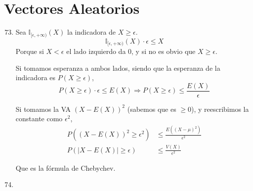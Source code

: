 \section{Vectores Aleatorios}
\begin{enumerate}
	\setcounter{enumi}{72}
	\item
		Sea $\mathbb{I}_{[\epsilon, +\infty)}(X)$ la indicadora de $X\geq \epsilon$.
		$$\mathbb{I}_{[\epsilon, +\infty)}(X)\cdot \epsilon \leq X$$
		Porque si $X<\epsilon$ el lado izquierdo da $0$, y si no es obvio que $X\geq \epsilon$.
		
		Si tomamos esperanza a ambos lados, siendo que la esperanza de la indicadora es $P(X \geq \epsilon)$,
		$$P(X\geq\epsilon) \cdot \epsilon \leq E(X) \Rightarrow P(X\geq\epsilon) \leq \frac{E(X)}{\epsilon}$$
		
		Si tomamos la VA $(X - E(X))^2$ (sabemos que es $\geq 0$), y reescribimos la constante como $\epsilon^2$,
		\begin{align*}
			P((X - E(X))^2 \geq\epsilon^2)	& \leq \frac{E((X - \mu)^2)}{\epsilon^2}	\\
			P(|X - E(X)| \geq\epsilon)		& \leq \frac{V(X)}{\epsilon^2}
		\end{align*}
		
		Que es la fórmula de Chebychev.
		
	\item
		
\end{enumerate}
